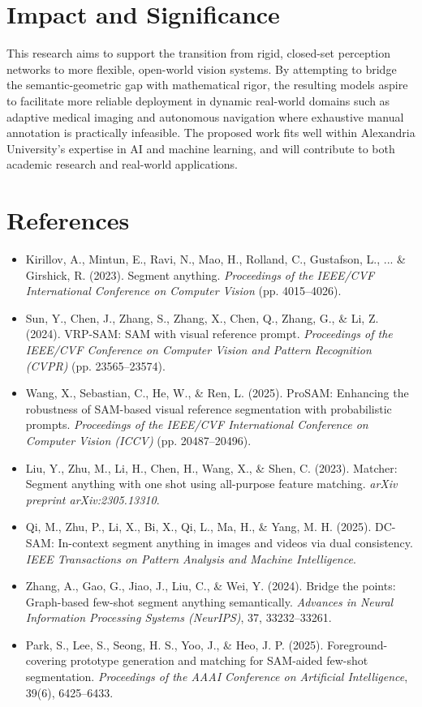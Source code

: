 \documentclass[journal,12pt,onecolumn,draftclsnofoot]{IEEEtran}
\begin{document}
\section{Impact and Significance}

This research aims to support the transition from rigid, closed-set perception networks to more flexible, open-world vision systems. By attempting to bridge the semantic-geometric gap with mathematical rigor, the resulting models aspire to facilitate more reliable deployment in dynamic real-world domains such as adaptive medical imaging and autonomous navigation where exhaustive manual annotation is practically infeasible.
The proposed work fits well within Alexandria University’s expertise in
AI and machine learning, and will contribute to both academic research and real-world applications.
\section{References}

\begin{itemize}[noitemsep, topsep=0pt]
    \item Kirillov, A., Mintun, E., Ravi, N., Mao, H., Rolland, C., Gustafson, L., ... \& Girshick, R. (2023). Segment anything. \textit{Proceedings of the IEEE/CVF International Conference on Computer Vision} (pp. 4015--4026).

    \item Sun, Y., Chen, J., Zhang, S., Zhang, X., Chen, Q., Zhang, G., \& Li, Z. (2024). VRP-SAM: SAM with visual reference prompt. \textit{Proceedings of the IEEE/CVF Conference on Computer Vision and Pattern Recognition (CVPR)} (pp. 23565--23574).

    \item Wang, X., Sebastian, C., He, W., \& Ren, L. (2025). ProSAM: Enhancing the robustness of SAM-based visual reference segmentation with probabilistic prompts. \textit{Proceedings of the IEEE/CVF International Conference on Computer Vision (ICCV)} (pp. 20487--20496).

    \item Liu, Y., Zhu, M., Li, H., Chen, H., Wang, X., \& Shen, C. (2023). Matcher: Segment anything with one shot using all-purpose feature matching. \textit{arXiv preprint arXiv:2305.13310}.

    \item Qi, M., Zhu, P., Li, X., Bi, X., Qi, L., Ma, H., \& Yang, M. H. (2025). DC-SAM: In-context segment anything in images and videos via dual consistency. \textit{IEEE Transactions on Pattern Analysis and Machine Intelligence}.

    \item Zhang, A., Gao, G., Jiao, J., Liu, C., \& Wei, Y. (2024). Bridge the points: Graph-based few-shot segment anything semantically. \textit{Advances in Neural Information Processing Systems (NeurIPS)}, 37, 33232--33261.

    \item Park, S., Lee, S., Seong, H. S., Yoo, J., \& Heo, J. P. (2025). Foreground-covering prototype generation and matching for SAM-aided few-shot segmentation. \textit{Proceedings of the AAAI Conference on Artificial Intelligence}, 39(6), 6425--6433.
\end{itemize}
\end{document}
